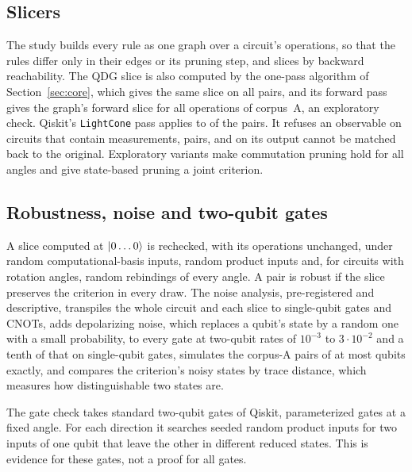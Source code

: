 \subsection{Slicers}
The study builds every rule as one graph over a circuit's operations, so that the rules differ only in their edges or
its pruning step, and slices by backward reachability. The QDG slice is also computed by the one-pass algorithm of
Section~\ref{sec:core}, which gives the same slice on all \numOnePassEqual{} pairs, and its forward pass gives the graph's forward slice for all \numOnePassForwardEqual{} operations of corpus~A, an exploratory check. Qiskit's \texttt{LightCone}
pass applies to \numLcqApplicable{} of the \numNPairs{} pairs. It refuses an observable on circuits that contain
measurements, \numLcqNaMeasurements{} pairs, and on \numLcqNaReorder{} its output cannot be matched back to the original.
Exploratory variants make commutation pruning hold for all angles and give state-based pruning a joint criterion.

\subsection{Robustness, noise and two-qubit gates}
A slice computed at $\lvert 0\dots0\rangle$ is rechecked, with its operations unchanged, under \numRobDraws{} random
computational-basis inputs, \numRobDraws{} random product inputs and, for circuits with rotation angles,
\numRobDraws{} random rebindings of every angle. A pair is robust if the slice preserves the criterion in every draw. The noise analysis, pre-registered and
descriptive, transpiles the whole circuit and each slice to single-qubit gates and CNOTs, adds depolarizing noise, which replaces a qubit's state by a random one with
a small probability, to every gate at two-qubit rates of $10^{-3}$ to $3\cdot10^{-2}$ and a tenth of that on single-qubit gates, simulates the
corpus-A pairs of at most \numNoiseMaxQubits{} qubits exactly, and compares the criterion's noisy states by trace
distance, which measures how distinguishable two states are.

The gate check takes \numGateSignalN{} standard two-qubit gates of Qiskit, parameterized gates at a fixed angle. For
each direction it searches seeded random product inputs for two inputs of one qubit that leave the other in different
reduced states. This is evidence for these gates, not a proof for all gates.

